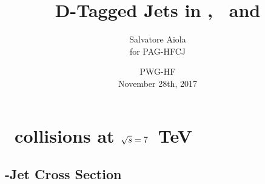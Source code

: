 \documentclass[xcolor={usenames,dvipsnames}, aspectratio=169]{beamer}
\title[D-Tagged Jets in \pp, \pPb\ and \PbPb] %
{D-Tagged Jets in \pp, \pPb\ and \PbPb}
\author[Salvatore Aiola]%
{Salvatore Aiola \\
for PAG-HFCJ}
\institute[Yale University] %
{Yale University}
\date[PWG-HF - Nov. 28th, 2017] %
{PWG-HF \\
November 28th, 2017}
\begin{document}
\begin{frame}
  \titlepage
\end{frame}








\section{\pp\ collisions at $\sqrt{s}=7$~TeV}

\subsection{\Dzero-Jet Cross Section}
\end{document}
